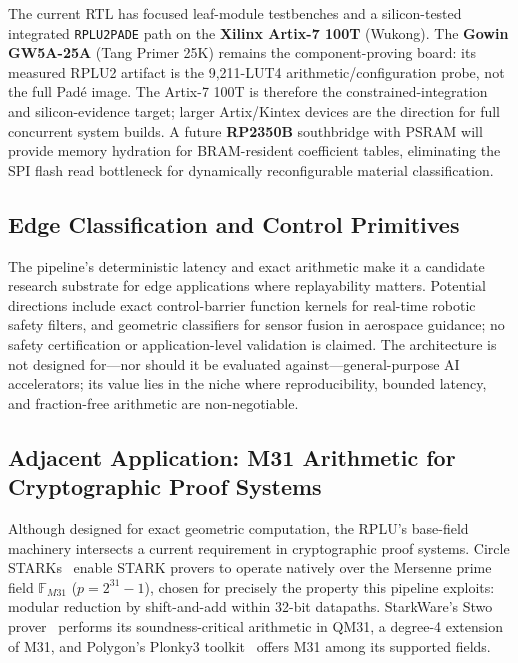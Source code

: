 \documentclass[conference]{IEEEtran}
\begin{document}
The current RTL has focused leaf-module testbenches and a silicon-tested
integrated \texttt{RPLU2PADE} path on the \textbf{Xilinx Artix-7 100T}
(Wukong). The \textbf{Gowin GW5A-25A} (Tang Primer 25K) remains the
component-proving board: its measured RPLU2 artifact is the 9,211-LUT4
arithmetic/configuration probe, not the full Pad\'{e} image. The Artix-7
100T is therefore the constrained-integration and silicon-evidence target;
larger Artix/Kintex devices are the direction for full concurrent system
builds. A future \textbf{RP2350B} southbridge with PSRAM will provide memory
hydration for BRAM-resident coefficient tables, eliminating the SPI flash
read bottleneck for dynamically reconfigurable material classification.

\subsection{Edge Classification and Control Primitives}

The pipeline's deterministic latency and exact arithmetic make it a candidate
research substrate for edge applications where replayability matters.
Potential directions include exact control-barrier
function kernels for real-time robotic safety filters, and geometric
classifiers for sensor fusion in aerospace guidance; no safety certification
or application-level validation is claimed. The architecture is not
designed for---nor should it be evaluated against---general-purpose AI
accelerators; its value lies in the niche where reproducibility, bounded
latency, and fraction-free arithmetic are non-negotiable.

\subsection{Adjacent Application: M31 Arithmetic for Cryptographic Proof Systems}
\label{sec:zk}

Although designed for exact geometric computation, the RPLU's base-field
machinery intersects a current requirement in cryptographic proof systems.
Circle STARKs~\cite{habock2024} enable STARK provers to operate natively
over the Mersenne prime field $\mathbb{F}_{M31}$ ($p = 2^{31}-1$), chosen
for precisely the property this pipeline exploits: modular reduction by
shift-and-add within 32-bit datapaths. StarkWare's Stwo prover~\cite{stwo}
performs its soundness-critical arithmetic in QM31, a degree-4 extension of
M31, and Polygon's Plonky3 toolkit~\cite{plonky3} offers M31 among its
supported fields.
\end{document}
